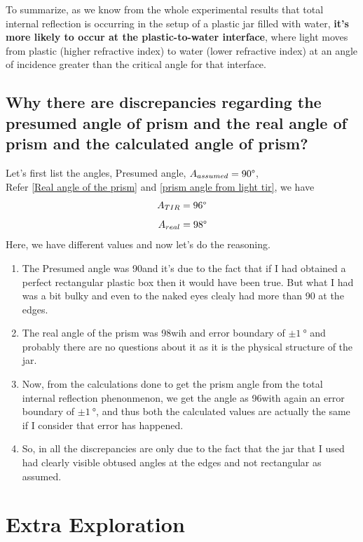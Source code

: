 \documentclass[twocolumn,11pt]{article}
\begin{document}
To summarize, as we know from the whole experimental results that total internal reflection is occurring in the setup of a plastic jar filled with water, \textbf{it's more likely to occur at the plastic-to-water interface}, where light moves from plastic (higher refractive index) to water (lower refractive index) at an angle of incidence greater than the critical angle for that interface.
\subsection{Why there are discrepancies regarding the presumed angle of prism and the real angle of prism and the calculated angle of prism?}

Let's first list the angles, 
Presumed angle, $A_{assumed} = 90\degree$,\\
Refer \eqref{Real angle of the prism} and \eqref{prism angle from light tir}, we have
$$A_{TIR} = 96\degree$$
$$A_{real} = 98 \degree$$
Here, we have different values and now let's do the reasoning.
\begin{enumerate}
    \item The Presumed angle was 90\degree and it's due to the fact that if I had obtained a perfect rectangular plastic box then it would have been true. But what I had was a bit bulky and even to the naked eyes clealy had more than 90 \degree at the edges.
    \item The real angle of the prism was 98\degree wih and error boundary of $\pm \SI{1}{\degree}$ and probably there are no questions about it as it is the physical structure of the jar.
    \item Now, from the calculations done to get the prism angle from the total internal reflection phenonmenon, we get the angle as 96\degree with again an error boundary of $\pm \SI{1}{\degree}$, and thus both the calculated values are actually the same if I consider that error has happened. 
    \item So, in all the discrepancies are only due to the fact that the jar that I used had clearly visible obtused angles at the edges and not rectangular as assumed. 
\end{enumerate}

\section{Extra Exploration}
\end{document}
